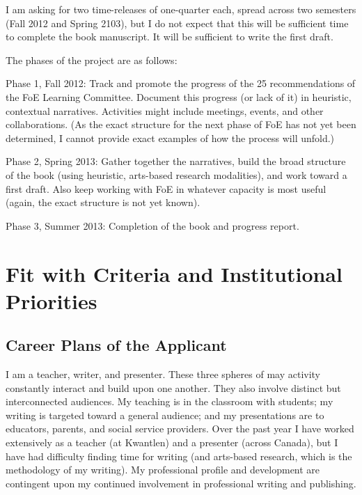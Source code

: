 \documentclass[letterpaper,10pt,headsepline]{scrreprt}
\begin{document}
I am asking for two time-releases of one-quarter each, spread across two semesters (Fall 2012 and Spring 2103), but I do not expect that this will be sufficient time to complete the book manuscript. It will be sufficient to write the first draft.

The phases of the project are as follows:

Phase 1, Fall 2012: Track and promote the progress of the 25 recommendations of the FoE Learning Committee. Document this progress (or lack of it) in heuristic, contextual narratives. Activities might include meetings, events, and other collaborations. (As the exact structure for the next phase of FoE has not yet been determined, I cannot provide exact examples of how the process will unfold.)

Phase 2, Spring 2013: Gather together the narratives, build the broad structure of the book (using heuristic, arts-based research modalities), and work toward a first draft. Also keep working with FoE in whatever capacity is most useful (again, the exact structure is not yet known).

Phase 3, Summer 2013: Completion of the book and progress report.
\section{Fit with Criteria and Institutional Priorities}
\label{sec-3}

\subsection{Career Plans of the Applicant}
\label{sec-3-1}
I am a teacher, writer, and presenter. These three spheres of may activity constantly interact and build upon one another. They also involve distinct but interconnected audiences. My teaching is in the classroom with students; my writing is targeted toward a general audience; and my presentations are to educators, parents, and social service providers. Over the past year I have worked extensively as a teacher (at Kwantlen) and a presenter (across Canada), but I have had difficulty finding time for writing (and arts-based research, which is the methodology of my writing). My professional profile and development are contingent upon my continued involvement in professional writing and publishing.
\end{document}
